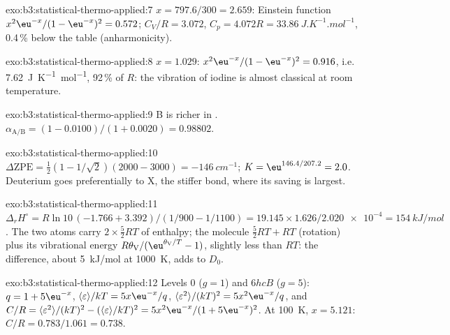 \begin{solution}{exo:b3:statistical-thermo-applied:7}
$x = 797.6/300 = 2.659$: Einstein function $x^2\eu^{-x}/(1 - \eu^{-x})^2 = 0.572$; $C_V/R = 3.072$,
$C_p = 4.072R = \qty{33.86}{J.K^{-1}.mol^{-1}}$, 0.4\,\% below the table (anharmonicity).
\end{solution}

\begin{solution}{exo:b3:statistical-thermo-applied:8}
$x = 1.029$: $x^2\eu^{-x}/(1 - \eu^{-x})^2 = 0.916$, i.e. \qty{7.62}{J.K^{-1}.mol^{-1}}, 92\,\% of $R$: the
vibration of iodine is almost classical at room temperature.
\end{solution}

\begin{solution}{exo:b3:statistical-thermo-applied:9}
B is richer in . $\alpha_{\mathrm{A/B}} = (1 - 0.0100)/(1 + 0.0020) = 0.98802$.
\end{solution}

\begin{solution}{exo:b3:statistical-thermo-applied:10}
$\Delta\mathrm{ZPE} = \frac12(1 - 1/\sqrt2)(2000 - 3000) = \qty{-146}{cm^{-1}}$; $K = \eu^{146.4/207.2} = 2.0$.
Deuterium goes preferentially to X, the stiffer bond, where its  saving is largest.
\end{solution}

\begin{solution}{exo:b3:statistical-thermo-applied:11}
$\Delta_rH^\circ = R\ln10\,(-1.766 + 3.392)/(1/900 - 1/1100) = 19.145 \times 1.626/\num{2.020e-4} =
\qty{154}{kJ/mol}$. The two atoms carry $2 \times \frac52RT$ of enthalpy; the molecule $\frac52RT + RT$
(rotation) plus its vibrational energy $R\theta_{\mathrm V}/(\eu^{\theta_{\mathrm V}/T} - 1)$, slightly less than $RT$:
the difference, about \qty{5}{kJ/mol} at \qty{1000}{K}, adds to $D_0$.
\end{solution}

\begin{solution}{exo:b3:statistical-thermo-applied:12}
Levels 0 ($g = 1$) and $6hcB$ ($g = 5$): $q = 1 + 5\eu^{-x}$, $\langle\varepsilon\rangle/kT = 5x\eu^{-x}/q$, $\langle\varepsilon^2\rangle/(kT)^2 =
5x^2\eu^{-x}/q$, and $C/R = \langle\varepsilon^2\rangle/(kT)^2 - (\langle\varepsilon\rangle/kT)^2 = 5x^2\eu^{-x}/(1 + 5\eu^{-x})^2$. At
\qty{100}{K}, $x = 5.121$: $C/R = 0.783/1.061 = 0.738$.
\end{solution}

